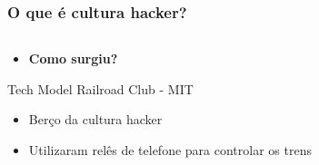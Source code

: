 \documentclass{beamer}
\begin{document}
\begin{frame}
  \frametitle{O que é cultura hacker?}
  \begin{columns}
    \begin{column}{0.5\textwidth}
      \begin{itemize}
        \item \textbf{Como surgiu?}
      \end{itemize}
      Tech Model Railroad Club - MIT
      \begin{itemize}
        \item Berço da cultura hacker
        \item Utilizaram relês de telefone para controlar os trens
      \end{itemize}
      \vspace*{\baselineskip}
    \end{column}
    \begin{column}{0.5\textwidth}
    \end{column}
  \end{columns}
\end{frame}
\end{document}
